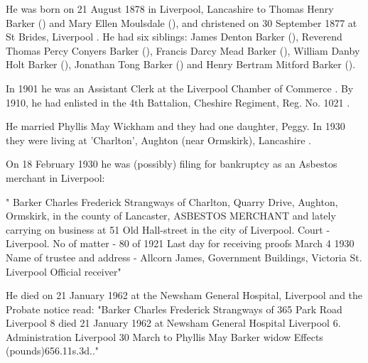 
He was born on 21 August 1878 in	Liverpool, Lancashire to Thomas Henry Barker () and Mary Ellen Moulsdale (), and christened on 30 September 1877 at St Brides, Liverpool \cite{CFSBarkerBaptism}. He had six siblings:  James Denton Barker (), Reverend Thomas Percy Conyers Barker (), Francis Darcy Mead Barker (), William Danby Holt Barker (), Jonathan Tong Barker () and Henry Bertram Mitford Barker (). 


In 1901 he was an Assistant Clerk at the Liverpool  Chamber of Commerce \cite{CFSBarkerOccupation}.  By 1910, he had enlisted in the  4th Battalion, Cheshire Regiment, Reg. No. 1021 \cite{CFSBarkerMilitary}.

He married Phyllis May Wickham and they had one daughter, Peggy. In 1930 they were living at 'Charlton', Aughton (near Ormskirk), Lancashire \cite{CFSBarker1930}.

On 18 February 1930 he was (possibly) filing for bankruptcy as an Asbestos merchant in Liverpool:

" Barker Charles Frederick Strangways of Charlton, Quarry Drive, Aughton, Ormskirk, in the county of Lancaster, ASBESTOS MERCHANT and lately carrying on business at 51 Old Hall-street in the city of Liverpool.
Court - Liverpool.
No of matter - 80 of 1921
Last day for receiving proofs March 4 1930
Name of trustee and address - Allcorn James, Government Buildings, Victoria St. Liverpool Official receiver" \cite{CFSBarker1930}


He died on 21 January 1962 at the Newsham General Hospital, Liverpool \cite{CFSBarkerDeath} and the Probate notice read:    
"Barker Charles Frederick Strangways of 365 Park Road Liverpool 8 died 21 January 1962 at Newsham General Hospital Liverpool 6. Administration Liverpool 30 March to Phyllis May Barker widow Effects (pounds)656.11s.3d.."
